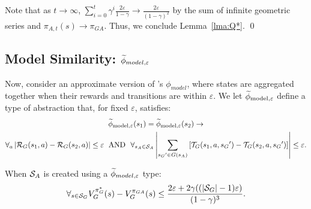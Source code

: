 Note that as $t \rightarrow \infty$, $\sum_{i=0}^{t}\gamma^i \frac{2\varepsilon}{1-\gamma} \rightarrow \frac{2\varepsilon}{(1-\gamma)^2}$ by the sum of infinite geometric series and $\pi_{A,t}(s) \rightarrow \pi_{GA}$.
Thus, we conclude Lemma~\ref{lma:Q*}.
\qed

\subsection{Model Similarity: $\widetilde \phi_{model,\varepsilon}$}
\label{sec:model}

Now, consider an approximate version of \citet{li2006towards}'s $\phi_{model}$, where states are aggregated together when their rewards and transitions are within $\varepsilon$.
\bdefn{$\epM$}
We let $\epM$ define a type of abstraction that, for fixed $\varepsilon$, satisfies:
\begin{multline}
\widetilde \phi_{\text{model},\varepsilon}(s_1) = \widetilde \phi_{\text{model},\varepsilon}(s_2) \rightarrow \\
\forall_a \left| \mathcal{R}_G(s_1, a) - \mathcal{R}_G(s_2, a)\right| \leq \varepsilon\; \text{~AND}\ \
\forall_{s_A \in \mathcal{S}_A} \left|\sum_{{s_G}' \in G(s_A)} \left[\mathcal{T}_G(s_1, a, {s_G}') - \mathcal{T}_G(s_2, a,{s_G}')\right] \right| \leq \varepsilon.
\end{multline}
\edefn

\begin{lma}
\label{lma:model}
When $\mathcal{S}_A$ is created using a $\widetilde \phi_{model,\varepsilon}$ type:
\begin{equation}
\forall_{s \in \mathcal{S}_G} V_G^{\pi_G^*}(s) - V_G^{\pi_{GA}}(s) \leq \frac{2\varepsilon + 2\gamma((|\mathcal{S}_G|-1)\varepsilon)}{(1-\gamma)^3}.
\end{equation}
\end{lma}

 \\

